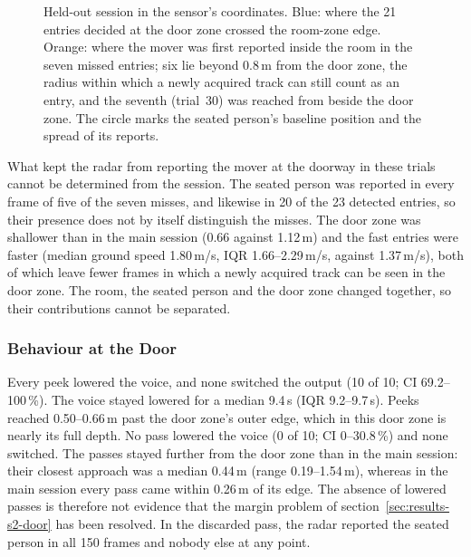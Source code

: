 \begin{figure}[htb]
  \caption{Held-out session in the sensor's coordinates. Blue: where the 21
  entries decided at the door zone crossed the room-zone edge. Orange: where
  the mover was first reported inside the room in the seven missed entries;
  six lie beyond 0.8\,m from the door zone, the radius within which a newly
  acquired track can still count as an entry, and the seventh (trial~30) was
  reached from beside the door zone. The circle marks the seated person's
  baseline position and the spread of its reports.}
  \label{fig:ps-holdout-plan}
\end{figure}

What kept the radar from reporting the mover at the doorway in these trials
cannot be determined from the session. The seated person was reported in every
frame of five of the seven misses, and likewise in 20 of the 23 detected
entries, so their presence does not by itself distinguish the misses. The door zone was shallower
than in the main session (0.66 against 1.12\,m) and the fast entries were faster
(median ground speed 1.80\,m/s, IQR 1.66--2.29\,m/s, against 1.37\,m/s), both of
which leave fewer frames in which a newly acquired track can be seen in the
door zone. The room, the seated person and the door zone changed together,
so their contributions cannot be separated.

\subsubsection{Behaviour at the Door}

Every peek lowered the voice, and none switched the output (10 of 10; CI
69.2--100\,\%). The voice stayed lowered for a median 9.4\,s (IQR
9.2--9.7\,s). Peeks reached 0.50--0.66\,m past the door zone's outer edge,
which in this door zone is nearly its full depth. No pass lowered the voice
(0 of 10; CI 0--30.8\,\%) and none switched. The passes stayed further from
the door zone than in the main session: their closest approach was a median
0.44\,m (range 0.19--1.54\,m), whereas in the main session every pass came
within 0.26\,m of its edge. The absence of lowered passes is therefore not
evidence that the margin problem of section~\ref{sec:results-s2-door} has been
resolved. In the discarded pass, the radar reported the seated person in all
150 frames and nobody else at any point.

